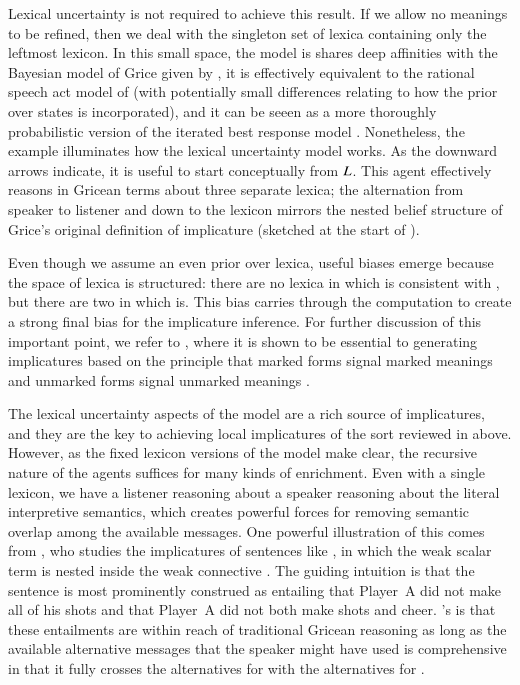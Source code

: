 \documentclass[leqno,12pt]{article}
\begin{document}
Lexical uncertainty is not required to achieve this result. If we
allow no meanings to be refined, then we deal with the singleton set
of lexica containing only the leftmost lexicon. In this small space,
the model is shares deep affinities with the Bayesian model of Grice
given by \citet{Russell:2012}, it is effectively equivalent to the
rational speech act model of \citet{Frank:Goodman:2012} (with
potentially small differences relating to how the prior over states is
incorporated), and it can be seeen as a more thoroughly probabilistic
version of the iterated best response model
\citep{Franke09DISS,Jaeger:2007,Jaeger:2011}. Nonetheless, the example
illuminates how the lexical uncertainty model works. As the downward
arrows indicate, it is useful to start conceptually from
$L$. This agent effectively reasons in Gricean
terms about three separate lexica; the alternation from speaker to
listener and down to the lexicon mirrors the nested belief structure
of Grice's original definition of implicature (sketched at the start
of ).

Even though we assume an even prior over lexica, useful biases emerge
because the space of lexica is structured: there are no lexica in
which  is consistent with , but there are two in
which  is. This bias carries through the computation to
create a strong final bias for the implicature inference. For further
discussion of this important point, we refer to
\citet{Bergen:Levy:Goodman:2014}, where it is shown to be essential to
generating implicatures based on the principle that marked forms
signal marked meanings and unmarked forms signal unmarked meanings
\citep{McCawley78,Horn84,Blutner98,Levinson00}.


The lexical uncertainty aspects of the model are a rich source of
implicatures, and they are the key to achieving local implicatures of
the sort reviewed in  above. However, as the
fixed lexicon versions of the model make clear, the recursive nature
of the agents suffices for many kinds of enrichment. Even with a
single lexicon, we have a listener reasoning about a speaker reasoning
about the literal interpretive semantics, which creates powerful
forces for removing semantic overlap among the available messages. One
powerful illustration of this comes from
\citet{Sauerland01,Sauerland04}, who studies the implicatures of
sentences like , in
which the weak scalar term  is nested inside
the weak connective . The guiding intuition is that the
sentence is most prominently construed as entailing that Player~A did
not make all of his shots and that Player~A did not both make shots
and cheer. \citeauthor{Sauerland01}'s is that these entailments are
within reach of traditional Gricean reasoning as long as the available
alternative messages that the speaker might have used is comprehensive
in that it fully crosses the alternatives for  with the
alternatives for .
\end{document}

